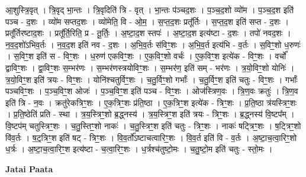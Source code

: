 \documentclass[17pt]{extarticle}
\begin{document}
आ॒शुस्त्रि॒वृत् । त्रि॒वृद् भा॒न्तः । त्रि॒वृदिति॑ त्रि - वृत् । भा॒न्तः प॑ञ्चद॒शः । प॒ञ्च॒द॒शो व्यो॑म । प॒ञ्च॒द॒श इति॑ पञ्च - द॒शः । व्यो॑म सप्तद॒शः । व्यो॑मेति॒ वि - ओ॒म॒ । स॒प्त॒द॒शः प्रतू᳚र्तिः । स॒प्त॒द॒श इति॑ सप्त - द॒शः । प्रतू᳚र्तिरष्टाद॒शः । प्रतू᳚र्ति॒रिति॒ प्र - तू॒र्तिः॒ । अ॒ष्टा॒द॒श स्तपः॑ । अ॒ष्टा॒द॒श इत्य॑ष्टा - द॒शः । तपो॑ नवद॒शः । न॒व॒द॒शो॑ऽभिव॒र्तः । न॒व॒द॒श इति॑ नव - द॒शः । अ॒भि॒व॒र्तः स॑विꣳ॒॒शः । अ॒भि॒व॒र्त इत्य॑भि - व॒र्तः । स॒विꣳ॒॒शो ध॒रुणः॑ । स॒विꣳ॒॒श इति॑ स - विꣳ॒॒शः । ध॒रुण॑ एकविꣳ॒॒शः । ए॒क॒विꣳ॒॒शो वर्चः॑ । ए॒क॒विꣳ॒॒श इत्ये॑क - विꣳ॒॒शः । वर्चो᳚ द्वाविꣳ॒॒शः । द्वा॒विꣳ॒॒शः स॒म्भर॑णः । स॒म्भर॑णस्त्रयोविꣳ॒॒शः । स॒म्भर॑ण॒ इति॑ सम् - भर॑णः । त्र॒यो॒विꣳ॒॒शो योनिः॑ । त्र॒यो॒विꣳ॒॒श इति॑ त्रयः - विꣳ॒॒शः । योनि॑श्चतुर्विꣳ॒॒शः । च॒तु॒र्विꣳ॒॒शो गर्भाः᳚ । च॒तु॒र्विꣳ॒॒श इति॑ चतुः - विꣳ॒॒शः । गर्भाः᳚ पञ्चविꣳ॒॒शः । प॒ञ्च॒विꣳ॒॒श ओजः॑ । प॒ञ्च॒विꣳ॒॒श इति॑ पञ्च - विꣳ॒॒शः । ओज॑स्त्रिण॒वः । त्रि॒ण॒वः क्रतुः॑ । त्रि॒ण॒व इति॑ त्रि - न॒वः । क्रतु॑रेकत्रिꣳ॒॒शः । ए॒क॒त्रिꣳ॒॒शः प्र॑ति॒ष्ठा । ए॒क॒त्रिꣳ॒॒श इत्ये॑क - त्रिꣳ॒॒शः । प्र॒ति॒ष्ठा त्र॑यस्त्रिꣳ॒॒शः । प्र॒ति॒ष्ठेति॑ प्रति - स्था । त्र॒य॒स्त्रिꣳ॒॒शो ब्र॒द्ध्नस्य॑ । त्र॒य॒स्त्रिꣳ॒॒श इति॑ त्रयः - त्रिꣳ॒॒शः । ब्र॒द्ध्नस्य॑ वि॒ष्टप᳚म् । वि॒ष्टप॑म् चतुस्त्रिꣳ॒॒शः । च॒तु॒स्तिꣳ॒॒शो नाकः॑ । च॒तु॒स्त्रिꣳ॒॒श इति॑ चतुः - त्रिꣳ॒॒शः । नाकः॑ षट्त्रिꣳ॒॒शः । ष॒ट्त्रिꣳ॒॒शो वि॑व॒र्तः । ष॒ट्॒त्रिꣳ॒॒श इति॑ षट् - त्रिꣳ॒॒शः । वि॒व॒र्तो᳚ऽष्टाचत्वारिꣳ॒॒शः । वि॒व॒र्त इति॑ वि - व॒र्तः । अ॒ष्टा॒च॒त्वा॒रिꣳ॒॒शो ध॒र्त्रः । अ॒ष्टा॒च॒त्वा॒रिꣳ॒॒श इत्य॑ष्टा - च॒त्वा॒रिꣳ॒॒शः । ध॒र्त्रश्च॑तुष्टो॒मः । च॒तु॒ष्टो॒म इति॑ चतुः - स्तो॒मः । \newline

\textbf{Jatai Paata} \newline
\end{document}
